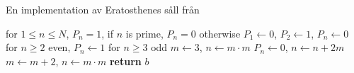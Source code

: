 \begin{algorithm}
    \caption{En implementation av Eratosthenes såll från \cite{HaraldSieve}} \label{SimpleSiev}
    \begin{algorithmic}[1]
        \Ensure for $1 \leq n \leq N$, $P_n = 1$, if $n$ is prime, $P_n = 0$ otherwise
                \State $P_1 \gets 0$, $P_2 \gets 1$, $P_n \gets 0$ for $n \geq 2$ even, $P_n \gets 1$ for $n \geq 3$ odd
                \State $m \gets 3$, $n \gets m \cdot m$ 
                         \Comment{[sic]}
                            \State $P_n \gets 0$, $n \gets n + 2m$ 
                        \EndWhile
                    \EndIf
                    \State $m \gets m + 2$, $n \gets m \cdot m$
                \EndWhile
            \State \textbf{return} $b$
        \EndFunction
    \end{algorithmic}
\end{algorithm}